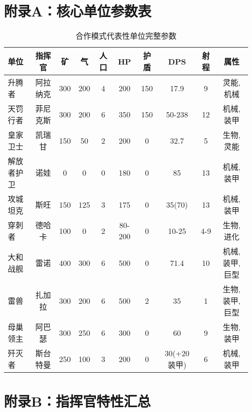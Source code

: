 \documentclass[a4paper,12pt]{article}
\begin{document}
\appendix
\section{附录A：核心单位参数表}

\begin{table}[h]
\centering
\caption{合作模式代表性单位完整参数}
\scriptsize
\begin{tabular}{lccccccccc}
\toprule
\textbf{单位} & \textbf{指挥官} & \textbf{矿} & \textbf{气} & \textbf{人口} & \textbf{HP} & \textbf{护盾} & \textbf{DPS} & \textbf{射程} & \textbf{属性} \\
\midrule
升腾者 & 阿拉纳克 & 300 & 200 & 4 & 200 & 150 & 17.9 & 9 & 灵能,机械 \\
天罚行者 & 菲尼克斯 & 300 & 200 & 6 & 350 & 150 & 50-238 & 12 & 机械,装甲 \\
皇家卫士 & 凯瑞甘 & 150 & 50 & 2 & 200 & 0 & 32.7 & 5 & 生物,灵能 \\
解放者护卫 & 诺娃 & 0 & 0 & 0 & 180 & 0 & 85 & 13 & 机械,装甲 \\
攻城坦克 & 斯旺 & 150 & 125 & 3 & 175 & 0 & 35(70) & 13 & 机械,装甲 \\
穿刺者 & 德哈卡 & 100 & 0 & 2 & 80-200 & 0 & 10-25 & 4-9 & 生物,进化 \\
大和战舰 & 雷诺 & 400 & 300 & 6 & 500 & 0 & 71.4 & 10 & 机械,装甲,巨型 \\
雷兽 & 扎加拉 & 300 & 200 & 6 & 500 & 2 & 35 & 1 & 生物,装甲,巨型 \\
母巢领主 & 阿巴瑟 & 300 & 250 & 6 & 300 & 0 & 60 & 9 & 生物,装甲 \\
歼灭者 & 斯台特曼 & 250 & 100 & 3 & 200 & 0 & 30(+20装甲) & 6 & 机械,装甲 \\
\bottomrule
\end{tabular}
\end{table}

\section{附录B：指挥官特性汇总}
\end{document}
